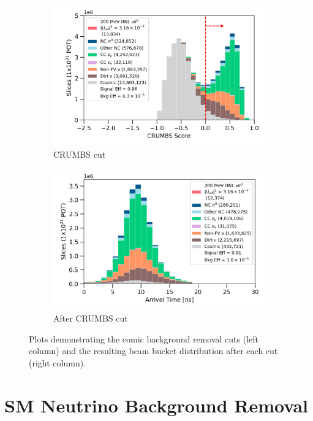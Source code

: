 \begin{figure}[h!]
\begin{subfigure}[b]{0.495\textwidth}
            \includegraphics[width=\textwidth]{crumbs_precut}
            \caption{CRUMBS cut}%
            \label{fig:crumbs_cut}
        \end{subfigure}
        \hfill
        \begin{subfigure}[b]{0.495\textwidth}   
            \centering 
            \includegraphics[width=\textwidth]{beam_bucket_post_crumbs}
            \caption{After CRUMBS cut}%
            \label{fig:bb_crumbs}
        \end{subfigure}
        \caption{
		Plots demonstrating the comic background removal cuts (left column) and the resulting beam bucket distribution after each cut (right column). 
	}
        \label{fig:cosmic_cut}
\end{figure}

\section{SM Neutrino Background Removal}
\label{sec:sm_rej}

